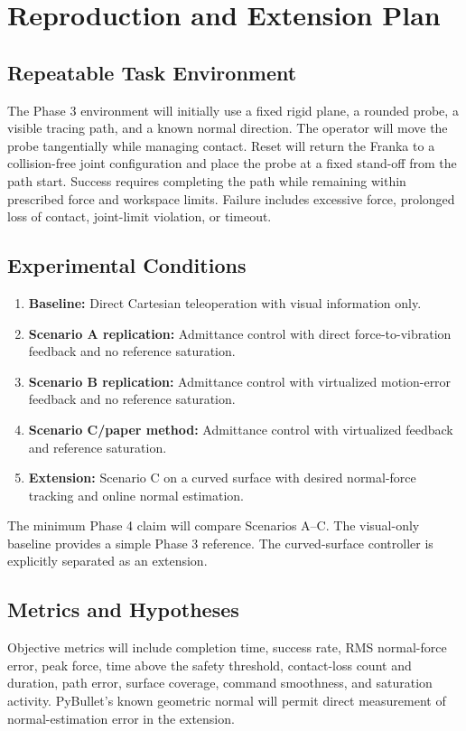 \documentclass[journal]{IEEEtran}
\begin{document}
\section{Reproduction and Extension Plan}
\subsection{Repeatable Task Environment}
The Phase 3 environment will initially use a fixed rigid plane, a rounded probe, a visible tracing path, and a known normal direction. The operator will move the probe tangentially while managing contact. Reset will return the Franka to a collision-free joint configuration and place the probe at a fixed stand-off from the path start. Success requires completing the path while remaining within prescribed force and workspace limits. Failure includes excessive force, prolonged loss of contact, joint-limit violation, or timeout.

\subsection{Experimental Conditions}
\begin{enumerate}
\item \textbf{Baseline:} Direct Cartesian teleoperation with visual information only.
\item \textbf{Scenario A replication:} Admittance control with direct force-to-vibration feedback and no reference saturation.
\item \textbf{Scenario B replication:} Admittance control with virtualized motion-error feedback and no reference saturation.
\item \textbf{Scenario C/paper method:} Admittance control with virtualized feedback and reference saturation.
\item \textbf{Extension:} Scenario C on a curved surface with desired normal-force tracking and online normal estimation.
\end{enumerate}
The minimum Phase 4 claim will compare Scenarios A--C. The visual-only baseline provides a simple Phase 3 reference. The curved-surface controller is explicitly separated as an extension.

\subsection{Metrics and Hypotheses}
Objective metrics will include completion time, success rate, RMS normal-force error, peak force, time above the safety threshold, contact-loss count and duration, path error, surface coverage, command smoothness, and saturation activity. PyBullet's known geometric normal will permit direct measurement of normal-estimation error in the extension.
\end{document}
